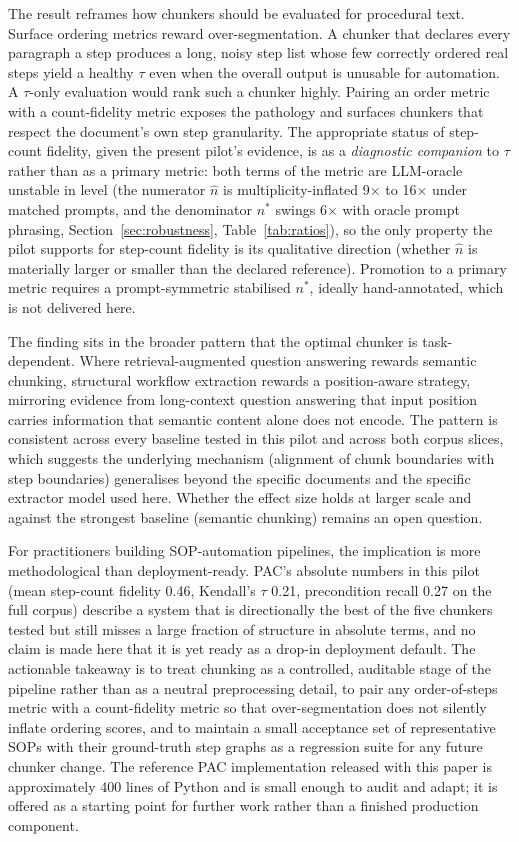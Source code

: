 \documentclass[make,article,submit,oneauthor,pdftex]{Definitions/mdpi}
\begin{document}
The result reframes how chunkers should be evaluated for procedural
text. Surface ordering metrics reward over-segmentation. A chunker
that declares every paragraph a step produces a long, noisy step list
whose few correctly ordered real steps yield a healthy $\tau$ even
when the overall output is unusable for automation. A $\tau$-only
evaluation would rank such a chunker highly. Pairing an order metric
with a count-fidelity metric exposes the pathology and surfaces
chunkers that respect the document's own step granularity. The
appropriate status of step-count fidelity, given the present pilot's
evidence, is as a \emph{diagnostic companion} to $\tau$ rather than
as a primary metric: both terms of the metric are LLM-oracle
unstable in level (the numerator $\hat{n}$ is multiplicity-inflated
9$\times$ to 16$\times$ under matched prompts, and the denominator
$n^{*}$ swings 6$\times$ with oracle prompt phrasing,
Section~\ref{sec:robustness}, Table~\ref{tab:ratios}), so the only
property the pilot supports for step-count fidelity is its qualitative
direction (whether $\hat{n}$ is materially larger or smaller than the
declared reference). Promotion to a primary metric requires a
prompt-symmetric stabilised $n^{*}$, ideally hand-annotated, which is
not delivered here.

The finding sits in the broader pattern that the optimal chunker is
task-dependent. Where retrieval-augmented question answering rewards
semantic chunking, structural workflow extraction rewards a
position-aware strategy, mirroring evidence from long-context
question answering that input position carries information that
semantic content alone does not encode\cite{liu2024lost}. The pattern
is consistent across every baseline tested in this pilot and across
both corpus slices, which suggests the underlying mechanism (alignment
of chunk boundaries with step boundaries) generalises beyond the
specific documents and the specific extractor model used here. Whether the
effect size holds at larger scale and against the strongest baseline
(semantic chunking) remains an open question.

For practitioners building SOP-automation pipelines, the implication
is more methodological than deployment-ready. PAC's absolute numbers
in this pilot (mean step-count fidelity 0.46, Kendall's $\tau$ 0.21,
precondition recall 0.27 on the full corpus) describe a system that is
directionally the best of the five chunkers tested but still misses a
large fraction of structure in absolute terms, and no claim is made
here that it is yet ready as a drop-in deployment default. The
actionable takeaway is to treat chunking as a controlled, auditable
stage of the pipeline rather than as a neutral preprocessing detail,
to pair any order-of-steps metric with a count-fidelity metric so that
over-segmentation does not silently inflate ordering scores, and to
maintain a small acceptance set of representative SOPs with their
ground-truth step graphs as a regression suite for any future chunker
change. The reference PAC implementation released with this paper is
approximately 400 lines of Python and is small enough to audit and
adapt; it is offered as a starting point for further work rather than
a finished production component.
\end{document}
